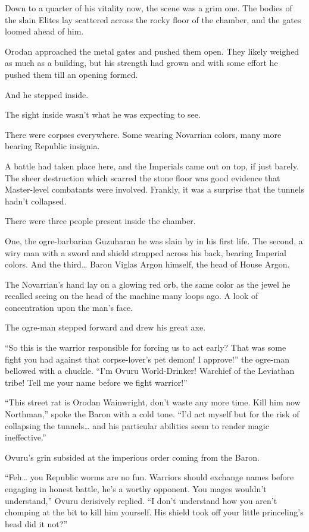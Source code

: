 \documentclass[a4paper,10pt]{book}
\begin{document}
Down to a quarter of his vitality now, the scene was a grim one. The bodies of the slain Elites lay scattered across the rocky floor of the chamber, and the gates loomed ahead of him.\par
Orodan approached the metal gates and pushed them open. They likely weighed as much as a building, but his strength had grown and with some effort he pushed them till an opening formed.\par
And he stepped inside.\par
\par
The sight inside wasn’t what he was expecting to see.\par
There were corpses everywhere. Some wearing Novarrian colors, many more bearing Republic insignia.\par
A battle had taken place here, and the Imperials came out on top, if just barely. The sheer destruction which scarred the stone floor was good evidence that Master-level combatants were involved. Frankly, it was a surprise that the tunnels hadn’t collapsed.\par
There were three people present inside the chamber.\par
One, the ogre-barbarian Guzuharan he was slain by in his first life. The second, a wiry man with a sword and shield strapped across his back, bearing Imperial colors. And the third… Baron Viglas Argon himself, the head of House Argon.\par
The Novarrian’s hand lay on a glowing red orb, the same color as the jewel he recalled seeing on the head of the machine many loops ago. A look of concentration upon the man’s face.\par
The ogre-man stepped forward and drew his great axe.\par
“So this is the warrior responsible for forcing us to act early? That was some fight you had against that corpse-lover’s pet demon! I approve!” the ogre-man bellowed with a chuckle. “I’m Ovuru World-Drinker! Warchief of the Leviathan tribe! Tell me your name before we fight warrior!”\par
“This street rat is Orodan Wainwright, don’t waste any more time. Kill him now Northman,” spoke the Baron with a cold tone. “I’d act myself but for the risk of collapsing the tunnels… and his particular abilities seem to render magic ineffective.”\par
Ovuru’s grin subsided at the imperious order coming from the Baron.\par
“Feh… you Republic worms are no fun. Warriors should exchange names before engaging in honest battle, he’s a worthy opponent. You mages wouldn’t understand,” Ovuru derisively replied. “I don’t understand how you aren’t chomping at the bit to kill him yourself. His shield took off your little princeling’s head did it not?”\par
\end{document}
